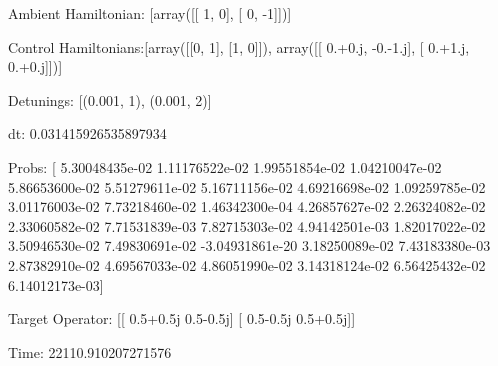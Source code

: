 \documentclass{article}
\begin{document}
    

\newpage

Ambient Hamiltonian: [array([[ 1,  0],
       [ 0, -1]])]

Control Hamiltonians:[array([[0, 1],
       [1, 0]]), array([[ 0.+0.j, -0.-1.j],
       [ 0.+1.j,  0.+0.j]])]

Detunings: [(0.001, 1), (0.001, 2)]

 dt: 0.031415926535897934

Probs: [  5.30048435e-02   1.11176522e-02   1.99551854e-02   1.04210047e-02
   5.86653600e-02   5.51279611e-02   5.16711156e-02   4.69216698e-02
   1.09259785e-02   3.01176003e-02   7.73218460e-02   1.46342300e-04
   4.26857627e-02   2.26324082e-02   2.33060582e-02   7.71531839e-03
   7.82715303e-02   4.94142501e-03   1.82017022e-02   3.50946530e-02
   7.49830691e-02  -3.04931861e-20   3.18250089e-02   7.43183380e-03
   2.87382910e-02   4.69567033e-02   4.86051990e-02   3.14318124e-02
   6.56425432e-02   6.14012173e-03]

Target Operator: [[ 0.5+0.5j  0.5-0.5j]
 [ 0.5-0.5j  0.5+0.5j]]

Time: 22110.910207271576
\end{document}
